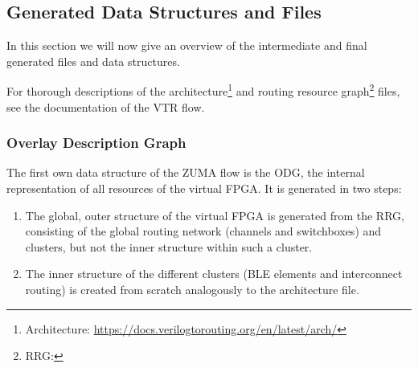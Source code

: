 \documentclass{article}
\begin{document}
\subsection{Generated Data Structures and Files}
\label{sub:data_structures_and_files_visualization}
In this section we will now give an overview of the intermediate and final generated files and data structures.

For thorough descriptions of the architecture\footnote{Architecture: \url{https://docs.verilogtorouting.org/en/latest/arch/}} and routing resource graph\footnote{RRG: \VTRdocRRG} files, see the documentation of the VTR flow.

\subsubsection{Overlay Description Graph}
The first own data structure of the ZUMA flow is the ODG, the internal representation of all resources of the virtual FPGA.
It is generated in two steps:
\begin{enumerate}
    \item The global, outer structure of the virtual FPGA is generated from the RRG, consisting of the global routing network (channels and switchboxes) and clusters, but not the inner structure within such a cluster.
    \item The inner structure of the different clusters (BLE elements and interconnect routing) is created from scratch analogously to the architecture file.
\end{enumerate}
\end{document}
